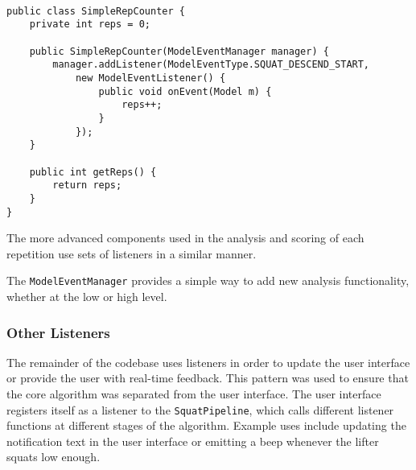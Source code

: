 \begin{lstlisting}[style=javastyle]

public class SimpleRepCounter {
	private int reps = 0;

	public SimpleRepCounter(ModelEventManager manager) {
		manager.addListener(ModelEventType.SQUAT_DESCEND_START,
			new ModelEventListener() {
				public void onEvent(Model m) {
					reps++;
				}
			});
	}

	public int getReps() {
		return reps;
	}
}

\end{lstlisting}

The more advanced components used in the analysis and scoring of each repetition use sets of listeners in a similar manner.

The \texttt{ModelEventManager} provides a simple way to add new analysis functionality, whether at the low or high level.

\subsubsection{Other Listeners}

The remainder of the codebase uses listeners in order to update the user interface or provide the user with real-time feedback. This pattern was used to ensure that the core algorithm was separated from the user interface. The user interface registers itself as a listener to the \texttt{SquatPipeline}, which calls different listener functions at different stages of the algorithm. Example uses include updating the notification text in the user interface or emitting a beep whenever the lifter squats low enough.